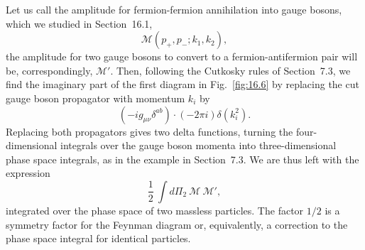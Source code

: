 Let us call the amplitude for fermion-fermion annihilation into gauge bosons,
which we studied in Section~16.1,
\begin{equation}
  \mathcal{M}(p_+, p_-; k_1, k_2) ,
  \label{eq:16.35}
\end{equation}
the amplitude for two gauge bosons to convert to a fermion-antifermion pair
will be, correspondingly, $\mathcal{M}'$.  Then, following the Cutkosky rules
of Section~7.3, we find the imaginary part of the first diagram in
Fig.~\ref{fig:16.6} by replacing the cut gauge boson propagator with momentum
$k_i$ by
\begin{equation}
  (-ig_{\mu\nu}\delta^{ab})\cdot(-2\pi i)\delta(k_i^2) .
  \label{eq:16.36}
\end{equation}
Replacing both propagators gives two delta functions, turning the
four-dimensional integrals over the gauge boson momenta into three-dimensional
phase space integrals, as in the example in Section~7.3.  We are thus left
with the expression
\begin{equation}
  \frac{1}{2}\ \int d\Pi_2\ \mathcal{M}\ \mathcal{M}' ,
  \label{eq:16.37}
\end{equation}
integrated over the phase space of two massless particles.  The factor $1/2$
is a symmetry factor for the Feynman diagram or, equivalently, a correction
to the phase space integral for identical particles.

